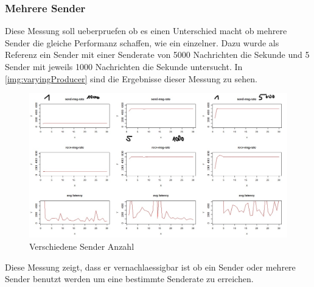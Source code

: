 \subsubsection{Mehrere Sender}
Diese Messung soll ueberpruefen ob es einen Unterschied macht ob mehrere Sender die gleiche Performanz schaffen, wie ein einzelner. Dazu wurde als Referenz ein Sender mit einer Senderate von 5000 Nachrichten die Sekunde und 5 Sender mit jeweils 1000 Nachrichten die Sekunde untersucht. 
In \autoref{img:varyingProducer} sind die Ergebnisse dieser Messung zu sehen. 
\begin{figure}
\center
  \includegraphics[width=1\textwidth]{images/varyingProducer.jpg}
  \caption{Verschiedene Sender Anzahl}
  \label{img:varyingProducer}
\end{figure}
Diese Messung zeigt, dass er vernachlaessigbar ist ob ein Sender oder mehrere Sender benutzt werden um eine bestimmte Senderate zu erreichen. 


